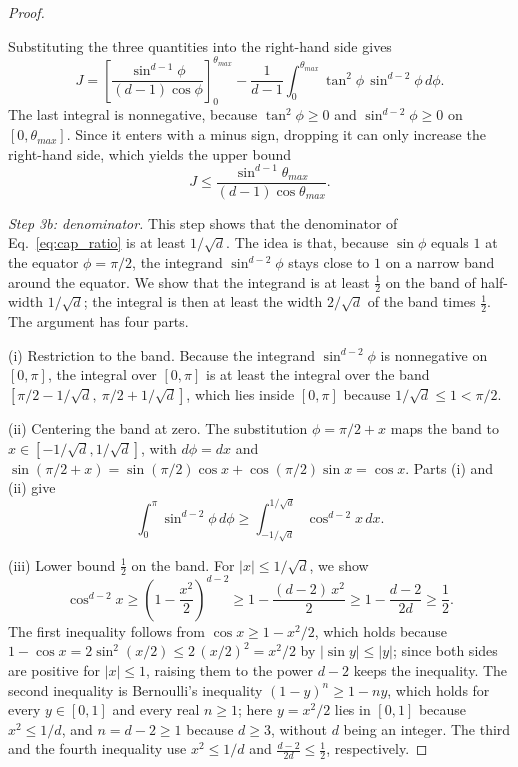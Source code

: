 \documentclass{article}
\theoremstyle{plain}
\theoremstyle{definition}
\theoremstyle{remark}
\begin{document}
\begin{proof}
\begin{itemize}
\end{itemize}
Substituting the three quantities into the right-hand side gives
\begin{equation}
    J = \left[ \frac{\sin^{d-1} \phi}{(d-1)\cos \phi} \right]_0^{\theta_{max}} - \frac{1}{d-1}\int_0^{\theta_{max}} \tan^2\phi \, \sin^{d-2}\phi \, d\phi.
\end{equation}
The last integral is nonnegative, because $\tan^2\phi \ge 0$ and $\sin^{d-2}\phi \ge 0$ on $[0, \theta_{max}]$. Since it enters with a minus sign, dropping it can only increase the right-hand side, which yields the upper bound
\begin{equation}
    J \le \frac{\sin^{d-1} \theta_{max}}{(d-1) \cos \theta_{max}}.
\end{equation}

\emph{Step 3b: denominator.} This step shows that the denominator of Eq.~\eqref{eq:cap_ratio} is at least $1/\sqrt{d}$. The idea is that, because $\sin\phi$ equals $1$ at the equator $\phi = \pi/2$, the integrand $\sin^{d-2}\phi$ stays close to $1$ on a narrow band around the equator. We show that the integrand is at least $\frac{1}{2}$ on the band of half-width $1/\sqrt{d}$; the integral is then at least the width $2/\sqrt{d}$ of the band times $\frac{1}{2}$. The argument has four parts.

(i) Restriction to the band. Because the integrand $\sin^{d-2}\phi$ is nonnegative on $[0, \pi]$, the integral over $[0, \pi]$ is at least the integral over the band $[\pi/2 - 1/\sqrt{d},\ \pi/2 + 1/\sqrt{d}]$, which lies inside $[0, \pi]$ because $1/\sqrt{d} \le 1 < \pi/2$.

(ii) Centering the band at zero. The substitution $\phi = \pi/2 + x$ maps the band to $x \in [-1/\sqrt{d}, 1/\sqrt{d}]$, with $d\phi = dx$ and $\sin(\pi/2 + x) = \sin(\pi/2)\cos x + \cos(\pi/2)\sin x = \cos x$. Parts (i) and (ii) give
\begin{equation}
    \int_0^{\pi} \sin^{d-2} \phi \, d\phi \ge \int_{-1/\sqrt{d}}^{1/\sqrt{d}} \cos^{d-2} x \, dx.
\end{equation}

(iii) Lower bound $\frac{1}{2}$ on the band. For $|x| \le 1/\sqrt{d}$, we show
\begin{equation}
    \cos^{d-2} x \ge \left(1 - \frac{x^2}{2}\right)^{d-2} \ge 1 - \frac{(d-2)\, x^2}{2} \ge 1 - \frac{d-2}{2d} \ge \frac{1}{2}.
\end{equation}
The first inequality follows from $\cos x \ge 1 - x^2/2$, which holds because $1 - \cos x = 2\sin^2(x/2) \le 2\,(x/2)^2 = x^2/2$ by $|\sin y| \le |y|$; since both sides are positive for $|x| \le 1$, raising them to the power $d-2$ keeps the inequality. The second inequality is Bernoulli's inequality $(1 - y)^n \ge 1 - n y$, which holds for every $y \in [0, 1]$ and every real $n \ge 1$; here $y = x^2/2$ lies in $[0, 1]$ because $x^2 \le 1/d$, and $n = d - 2 \ge 1$ because $d \ge 3$, without $d$ being an integer. The third and the fourth inequality use $x^2 \le 1/d$ and $\frac{d-2}{2d} \le \frac{1}{2}$, respectively.


\end{proof}
\end{document}
